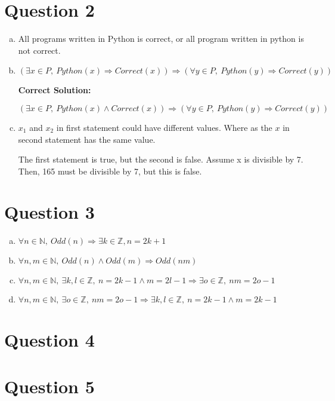 \documentclass[12pt]{article}
\begin{document}
\section*{Question 2}
\begin{enumerate}[a.]
    \item

    All programs written in Python is correct, or all program written in python
    is not correct.

    \item

    $(\exists x \in P,\:Python(x) \Rightarrow Correct(x)) \Rightarrow (\forall y
    \in P,\:Python(y) \Rightarrow Correct(y))$

    \bigskip

    \textbf{Correct Solution:}

    $(\exists x \in P,\:Python(x) \land Correct(x)) \Rightarrow (\forall y \in P,\:
    Python(y) \Rightarrow Correct(y))$

    \item

    $x_1$ and $x_2$ in first statement could have different values. Where as the $x$ in
    second statement has the same value.

    \bigskip

    The first statement is true, but the second is false. Assume x is divisible by 7.
    Then, 165 must be divisible by 7, but this is false.

\end{enumerate}

\section*{Question 3}
\begin{enumerate}[a.]
    \item

    $\forall n \in \mathbb{N},\:Odd(n) \Rightarrow \exists k \in \mathbb{Z}, n = 2k + 1$

    \item

    $\forall n,m \in \mathbb{N},\:Odd(n) \land Odd(m) \Rightarrow Odd(nm)$

    \item

    $\forall n,m \in \mathbb{N},\: \exists k,l \in \mathbb{Z},\:n = 2k - 1 \land
    m = 2l - 1 \Rightarrow \exists o \in \mathbb{Z},\:nm = 2o - 1$

    \item

    $\forall n,m \in \mathbb{N},\:\exists o \in \mathbb{Z},\:nm = 2o - 1 \Rightarrow
    \exists k,l \in \mathbb{Z},\: n = 2k - 1 \land m = 2k - 1$

\end{enumerate}

\section*{Question 4}

\section*{Question 5}
\end{document}
